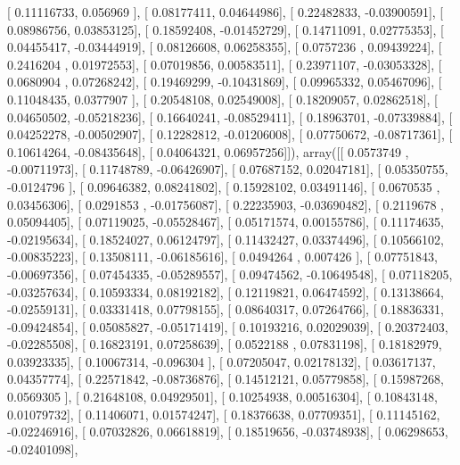 \documentclass{article}
\begin{document}
       [ 0.11116733,  0.056969  ],
       [ 0.08177411,  0.04644986],
       [ 0.22482833, -0.03900591],
       [ 0.08986756,  0.03853125],
       [ 0.18592408, -0.01452729],
       [ 0.14711091,  0.02775353],
       [ 0.04455417, -0.03444919],
       [ 0.08126608,  0.06258355],
       [ 0.0757236 ,  0.09439224],
       [ 0.2416204 ,  0.01972553],
       [ 0.07019856,  0.00583511],
       [ 0.23971107, -0.03053328],
       [ 0.0680904 ,  0.07268242],
       [ 0.19469299, -0.10431869],
       [ 0.09965332,  0.05467096],
       [ 0.11048435,  0.0377907 ],
       [ 0.20548108,  0.02549008],
       [ 0.18209057,  0.02862518],
       [ 0.04650502, -0.05218236],
       [ 0.16640241, -0.08529411],
       [ 0.18963701, -0.07339884],
       [ 0.04252278, -0.00502907],
       [ 0.12282812, -0.01206008],
       [ 0.07750672, -0.08717361],
       [ 0.10614264, -0.08435648],
       [ 0.04064321,  0.06957256]]), array([[ 0.0573749 , -0.00711973],
       [ 0.11748789, -0.06426907],
       [ 0.07687152,  0.02047181],
       [ 0.05350755, -0.0124796 ],
       [ 0.09646382,  0.08241802],
       [ 0.15928102,  0.03491146],
       [ 0.0670535 ,  0.03456306],
       [ 0.0291853 , -0.01756087],
       [ 0.22235903, -0.03690482],
       [ 0.2119678 ,  0.05094405],
       [ 0.07119025, -0.05528467],
       [ 0.05171574,  0.00155786],
       [ 0.11174635, -0.02195634],
       [ 0.18524027,  0.06124797],
       [ 0.11432427,  0.03374496],
       [ 0.10566102, -0.00835223],
       [ 0.13508111, -0.06185616],
       [ 0.0494264 ,  0.007426  ],
       [ 0.07751843, -0.00697356],
       [ 0.07454335, -0.05289557],
       [ 0.09474562, -0.10649548],
       [ 0.07118205, -0.03257634],
       [ 0.10593334,  0.08192182],
       [ 0.12119821,  0.06474592],
       [ 0.13138664, -0.02559131],
       [ 0.03331418,  0.07798155],
       [ 0.08640317,  0.07264766],
       [ 0.18836331, -0.09424854],
       [ 0.05085827, -0.05171419],
       [ 0.10193216,  0.02029039],
       [ 0.20372403, -0.02285508],
       [ 0.16823191,  0.07258639],
       [ 0.0522188 ,  0.07831198],
       [ 0.18182979,  0.03923335],
       [ 0.10067314, -0.096304  ],
       [ 0.07205047,  0.02178132],
       [ 0.03617137,  0.04357774],
       [ 0.22571842, -0.08736876],
       [ 0.14512121,  0.05779858],
       [ 0.15987268,  0.0569305 ],
       [ 0.21648108,  0.04929501],
       [ 0.10254938,  0.00516304],
       [ 0.10843148,  0.01079732],
       [ 0.11406071,  0.01574247],
       [ 0.18376638,  0.07709351],
       [ 0.11145162, -0.02246916],
       [ 0.07032826,  0.06618819],
       [ 0.18519656, -0.03748938],
       [ 0.06298653, -0.02401098],
\end{document}
